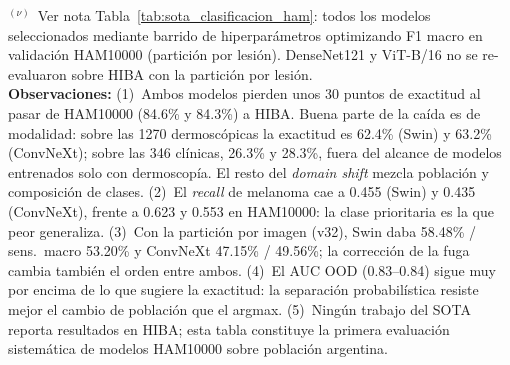 \begin{table}[htbp]
{\begin{tabular}{@{}llcrrrrr@{}}
\bottomrule
\end{tabular}%
}
\vspace{4pt}
\begin{minipage}{\textwidth}
  \footnotesize
  $^{(\nu)}$~Ver nota Tabla~\ref{tab:sota_clasificacion_ham}: todos los modelos seleccionados
  mediante barrido de hiperparámetros optimizando F1 macro en validación HAM10000 (partición por
  lesión). DenseNet121 y ViT-B/16 no se re-evaluaron sobre HIBA con la partición por lesión.\\[4pt]
  \textbf{Observaciones:}
  (1)~Ambos modelos pierden unos 30 puntos de exactitud al pasar de HAM10000 (84.6\% y 84.3\%) a HIBA.
  Buena parte de la caída es de modalidad: sobre las 1270 dermoscópicas la exactitud es 62.4\% (Swin) y
  63.2\% (ConvNeXt); sobre las 346 clínicas, 26.3\% y 28.3\%, fuera del alcance de modelos entrenados solo
  con dermoscopía. El resto del \textit{domain shift} mezcla población y composición de clases.
  (2)~El \textit{recall} de melanoma cae a 0.455 (Swin) y 0.435 (ConvNeXt), frente a 0.623 y 0.553 en
  HAM10000: la clase prioritaria es la que peor generaliza.
  (3)~Con la partición por imagen (v32), Swin daba 58.48\% / sens.\ macro 53.20\% y ConvNeXt
  47.15\% / 49.56\%; la corrección de la fuga cambia también el orden entre ambos.
  (4)~El AUC OOD (0.83--0.84) sigue muy por encima de lo que sugiere la exactitud: la separación
  probabilística resiste mejor el cambio de población que el argmax.
  (5)~Ningún trabajo del SOTA reporta resultados en HIBA; esta tabla constituye
  la primera evaluación sistemática de modelos HAM10000 sobre población argentina.
\end{minipage}
\end{table}


